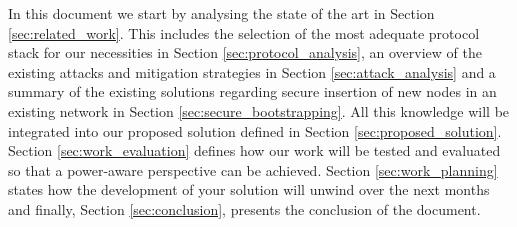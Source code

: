 In this document we start by analysing the state of the art in Section \ref{sec:related_work}. This includes the selection of the most adequate protocol stack for our necessities in Section \ref{sec:protocol_analysis}, an overview of the existing attacks and mitigation strategies in Section \ref{sec:attack_analysis} and a summary of the existing solutions regarding secure insertion of new nodes in an existing network in Section \ref{sec:secure_bootstrapping}. All this knowledge will be integrated into our proposed solution defined in Section \ref{sec:proposed_solution}. Section \ref{sec:work_evaluation} defines how our work will be tested and evaluated so that a power-aware perspective can be achieved. Section \ref{sec:work_planning} states how the development of your solution will unwind over the next months and finally, Section \ref{sec:conclusion}, presents the conclusion of the document.
